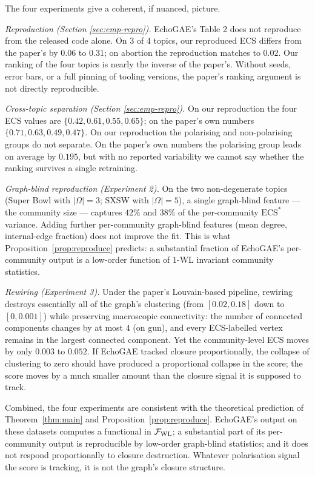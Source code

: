 The four experiments give a coherent, if nuanced, picture.

\emph{Reproduction (Section \ref{sec:emp-repro}).} EchoGAE's Table 2
does not reproduce from the released code alone. On $3$ of $4$
topics, our reproduced ECS differs from the paper's by $0.06$ to
$0.31$; on abortion the reproduction matches to $0.02$. Our ranking
of the four topics is nearly the inverse of the paper's. Without
seeds, error bars, or a full pinning of tooling versions, the
paper's ranking argument is not directly reproducible.

\emph{Cross-topic separation (Section \ref{sec:emp-repro}).} On our
reproduction the four ECS values are $\{0.42, 0.61, 0.55, 0.65\}$;
on the paper's own numbers $\{0.71, 0.63, 0.49, 0.47\}$. On our
reproduction the polarising and non-polarising groups do not
separate. On the paper's own numbers the polarising group leads on
average by $0.195$, but with no reported variability we cannot say
whether the ranking survives a single retraining.

\emph{Graph-blind reproduction (Experiment 2).} On the two
non-degenerate topics (Super Bowl with $|\Omega| = 3$; SXSW with
$|\Omega| = 5$), a single graph-blind feature --- the community
size --- captures $42\%$ and $38\%$ of the per-community
$\mathrm{ECS}^*$ variance. Adding further per-community
graph-blind features (mean degree, internal-edge fraction) does
not improve the fit. This is what Proposition~\ref{prop:reproduce} predicts:
a substantial fraction of EchoGAE's per-community output is a
low-order function of $1$-WL invariant community statistics.

\emph{Rewiring (Experiment 3).} Under the paper's Louvain-based
pipeline, rewiring destroys essentially all of the graph's
clustering (from $[0.02, 0.18]$ down to $[0, 0.001]$) while
preserving macroscopic connectivity: the number of connected
components changes by at most $4$ (on gun), and every ECS-labelled
vertex remains in the largest connected component. Yet the
community-level ECS moves by only $0.003$ to $0.052$. If EchoGAE
tracked closure proportionally, the collapse of clustering to zero
should have produced a proportional collapse in the score; the
score moves by a much smaller amount than the closure signal it is
supposed to track.

Combined, the four experiments are consistent with the theoretical
prediction of Theorem~\ref{thm:main} and Proposition~\ref{prop:reproduce}. EchoGAE's
output on these datasets computes a functional in
$\mathcal{F}_{\mathrm{WL}}$; a substantial part of its per-community output
is reproducible by low-order graph-blind statistics; and it does
not respond proportionally to closure destruction. Whatever
polarisation signal the score is tracking, it is not the graph's
closure structure.


